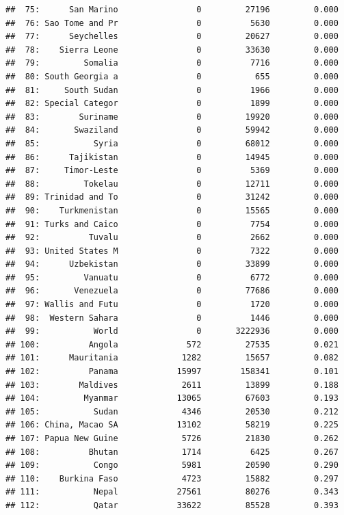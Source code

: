 \documentclass[10pt,]{article}
\begin{document}
\begin{verbatim}
##  75:      San Marino                0         27196         0.000
##  76: Sao Tome and Pr                0          5630         0.000
##  77:      Seychelles                0         20627         0.000
##  78:    Sierra Leone                0         33630         0.000
##  79:         Somalia                0          7716         0.000
##  80: South Georgia a                0           655         0.000
##  81:     South Sudan                0          1966         0.000
##  82: Special Categor                0          1899         0.000
##  83:        Suriname                0         19920         0.000
##  84:       Swaziland                0         59942         0.000
##  85:           Syria                0         68012         0.000
##  86:      Tajikistan                0         14945         0.000
##  87:     Timor-Leste                0          5369         0.000
##  88:         Tokelau                0         12711         0.000
##  89: Trinidad and To                0         31242         0.000
##  90:    Turkmenistan                0         15565         0.000
##  91: Turks and Caico                0          7754         0.000
##  92:          Tuvalu                0          2662         0.000
##  93: United States M                0          7322         0.000
##  94:      Uzbekistan                0         33899         0.000
##  95:         Vanuatu                0          6772         0.000
##  96:       Venezuela                0         77686         0.000
##  97: Wallis and Futu                0          1720         0.000
##  98:  Western Sahara                0          1446         0.000
##  99:           World                0       3222936         0.000
## 100:          Angola              572         27535         0.021
## 101:      Mauritania             1282         15657         0.082
## 102:          Panama            15997        158341         0.101
## 103:        Maldives             2611         13899         0.188
## 104:         Myanmar            13065         67603         0.193
## 105:           Sudan             4346         20530         0.212
## 106: China, Macao SA            13102         58219         0.225
## 107: Papua New Guine             5726         21830         0.262
## 108:          Bhutan             1714          6425         0.267
## 109:           Congo             5981         20590         0.290
## 110:    Burkina Faso             4723         15882         0.297
## 111:           Nepal            27561         80276         0.343
## 112:           Qatar            33622         85528         0.393

\end{verbatim}
\end{document}
